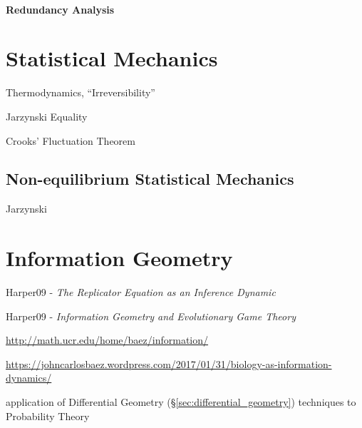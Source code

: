 \paragraph{Redundancy Analysis}\label{sec:redundancy_analysis}\hfill



\section{Statistical Mechanics}\label{sec:statistical_mechanics}

Thermodynamics, ``Irreversibility''

Jarzynski Equality

Crooks' Fluctuation Theorem



\subsection{Non-equilibrium Statistical Mechanics}
\label{sec:nonequilibrium_statistical_mechanics}

Jarzynski



\section{Information Geometry}\label{sec:information_geometry}

Harper09 - \emph{The Replicator Equation as an Inference Dynamic}

Harper09 - \emph{Information Geometry and Evolutionary Game Theory}

\url{http://math.ucr.edu/home/baez/information/}

\url{https://johncarlosbaez.wordpress.com/2017/01/31/biology-as-information-dynamics/}

application of Differential Geometry
(\S\ref{sec:differential_geometry}) techniques to Probability Theory



